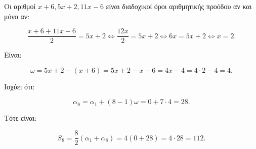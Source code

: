 
\begin{alist}
\item Οι αριθμοί $x + 6, 5x + 2, 11x - 6$ είναι διαδοχικοί όροι αριθμητικής προόδου αν
και μόνο αν:

\[\dfrac{x + 6 + 11x - 6}{2} = 5x + 2 \Leftrightarrow \dfrac{12x}{2} = 5x + 2 \Leftrightarrow 6x = 5x + 2 \Leftrightarrow x = 2.\]

Είναι:

\[\omega = 5x + 2 - (x + 6) = 5x + 2 - x - 6 = 4x - 4 = 4 \cdot 2 - 4 = 4.\]

\item Ισχύει ότι:

\[\alpha_8 = \alpha_1 + (8 - 1)\omega = 0 + 7 \cdot 4 = 28.\]

Τότε είναι:

\[S_8 = \dfrac{8}{2}(\alpha_1 + \alpha_8) = 4(0 + 28) = 4 \cdot 28 = 112.\]
\end{alist}

